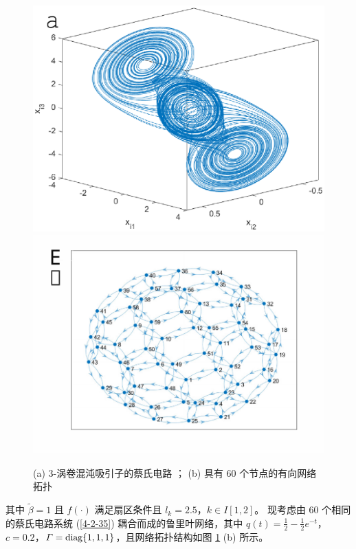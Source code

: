 \begin{figure}[!tp]
    \centering
    \includegraphics[scale=0.5]{./ch4/fig4-3-1.eps}
    \includegraphics[scale=0.5]{./ch4/fig4-3-2.pdf} 
    \caption{(a) 3-涡卷混沌吸引子的蔡氏电路 \cite{yalcin2000experimental425}； (b) 具有 60 个节点的有向网络拓扑}
    \label{f4-3}
\end{figure}

\noindent 其中 $\tilde{\beta}=1$ 且 $f(\cdot)$ 满足扇区条件且 $l_k=2.5$，$k\in I[1,2]$。 现考虑由 $60$ 个相同的蔡氏电路系统 (\ref{4-2-35}) 耦合而成的鲁里叶网络，其中 $q(t)=\frac{1}{2}-\frac{1}{2}e^{-t}$，$ c=0.2$，$\varGamma={\rm diag}\{1,1,1\}$，且网络拓扑结构如图 \ref{f4-3} (b) 所示。

